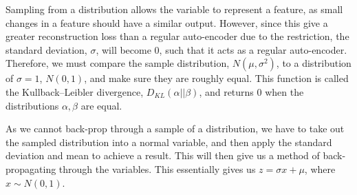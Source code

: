 Sampling from a distribution allows the variable to represent a feature, as small changes in a feature should have a similar output. However, since this give a greater reconstruction loss than a regular auto-encoder due to the restriction, the standard deviation, $\sigma$, will become $0$, such that it acts as a regular auto-encoder. Therefore, we must compare the sample distribution, $N(\mu, \sigma^2)$, to a distribution of $\sigma=1$, $N(0,1)$, and make sure they are roughly equal. This function is called the Kullback–Leibler divergence, $D_{KL}(\alpha||\beta)$, and returns $0$ when the distributions $\alpha,\beta$ are equal.

As we cannot back-\gls{prop} through a sample of a distribution, we have to take out the sampled distribution into a normal variable, and then apply the standard deviation and mean to achieve a result. This will then give us a method of back-propagating through the variables. This essentially gives us $z=\sigma x+\mu$, where $x\sim N(0,1)$.
